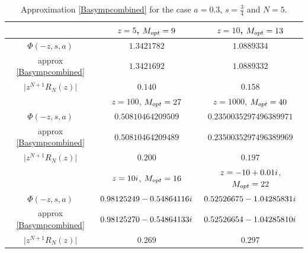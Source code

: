 \documentclass[11pt]{article}
\numberwithin{equation}{section}
\numberwithin{equation}{section}
\def\iunit{{\rm i}}
\begin{document}
\begin{table}[ht]\renewcommand{\arraystretch}{1.2}
\begin{center}
\begin{tabular}{|c|c|c|}
\hline
 & $z=5$, $M_{\rm opt}=9$
 & $z=10$, $M_{\rm opt}=13$ \\
\hline
$\Phi(-z,s,a)$
& $1.3421782$
& $1.0889334$\\

approx \eqref{Basympcombined}
& $1.3421692$
& $1.0889332$\\

$\bigl|z^{N+1}R_N(z)\bigr|$
& $0.140$
& $0.158$\\
\hline
 & $z=100$, $M_{\rm opt}=27$
 & $z=1000$, $M_{\rm opt}=40$ \\
\hline
$\Phi(-z,s,a)$
& $0.50810464209509$
& $0.2350035297496389971$\\

approx \eqref{Basympcombined}
& $0.50810464209489$
& $0.2350035297496389969$\\

$\bigl|z^{N+1}R_N(z)\bigr|$
& $0.200$
& $0.197$\\
\hline
 & $z=10\iunit$, $M_{\rm opt}=16$
 & $z=-10+0.01\iunit$, $M_{\rm opt}=22$ \\
\hline
$\Phi(-z,s,a)$
& $0.98125249 - 0.54864116\iunit$
& $0.52526675 - 1.04285831\iunit$\\

approx \eqref{Basympcombined}
& $0.98125270 - 0.54864133\iunit$
& $0.52526654 - 1.04285810\iunit$\\

$\bigl|z^{N+1}R_N(z)\bigr|$
& $0.269$
& $0.297$\\

\hline
\end{tabular}
\caption{Approximation \eqref{Basympcombined} for the case $a=0.3$, $s=\frac34$
and $N=5$.}
\label{tab:combined}
\end{center}
\end{table}%
\end{document}
